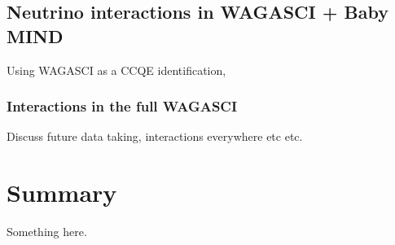 \subsection{Neutrino interactions in WAGASCI + Baby MIND}

Using WAGASCI as a CCQE identification,

\subsubsection{Interactions in the full WAGASCI}

Discuss future data taking, interactions everywhere etc etc.



\section{Summary}
Something here.